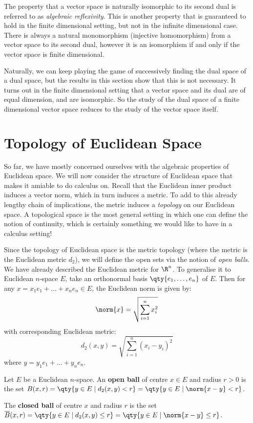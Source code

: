 The property that a vector space is naturally isomorphic to its second dual is referred to as \emph{algebraic reflexivity}. This is another property that is guaranteed to hold in the finite dimensional setting, but not in the infinite dimensional case. There is always a natural monomorphism (injective homomorphism) from a vector space to its second dual, however it is an isomorphism if and only if the vector space is finite dimensional.

\vspace{3mm}

Naturally, we can keep playing the game of successively finding the dual space of a dual space, but the results in this section show that this is not necessary. It turns out in the finite dimensional setting that a vector space and its dual are of equal dimension, and are isomorphic. So the study of the dual space of a finite dimensional vector space reduces to the study of the vector space itself.

\section{Topology of Euclidean Space}
So far, we have mostly concerned ourselves with the algebraic properties of Euclidean space. We will now consider the structure of Euclidean space that makes it amiable to do calculus on. Recall that the Euclidean inner product induces a vector norm, which in turn induces a metric. To add to this already lengthy chain of implications, the metric induces a \emph{topology} on our Euclidean space. A topological space is the most general setting in which one can define the notion of continuity, which is certainly something we would like to have in a calculus setting!

\vspace{3mm}

Since the topology of Euclidean space is the metric topology (where the metric is the Euclidean metric \( d_2 \)), we will define the open sets via the notion of \emph{open balls}. We have already described the Euclidean metric for \( \R^n \). To generalise it to Euclidean \( n \)-space \( E \), take an orthonormal basis \( \qty{e_1,\dots,e_n} \) of \( E \). Then for any \( x=x_1e_1+\dots+x_ne_n\in E \), the Euclidean norm is given by:
\[ \norm{x}=\sqrt{\sum_{i=1}^nx_i^2} \]
with corresponding Euclidean metric:
\[ d_2(x,y)=\sqrt{\sum_{i=1}^n(x_i-y_i)^2} \]
where \( y=y_1e_1+\dots+y_ne_n \).

\begin{definition}
  Let \( E \) be a Euclidean \( n \)-space. An \textbf{open ball} of centre \( x\in E \) and radius \( r>0 \) is the set \( B(x,r)=\qty{y\in E\mid d_2(x,y)<r}=\qty{y\in E\mid \norm{x-y}<r} \).

  \vspace{3mm}

  The \textbf{closed ball} of centre \( x \) and radius \( r \) is the set \( \overline{B}(x,r)=\qty{y\in E\mid d_2(x,y)\leq r}=\qty{y\in E\mid \norm{x-y}\leq r} \).
\end{definition}

